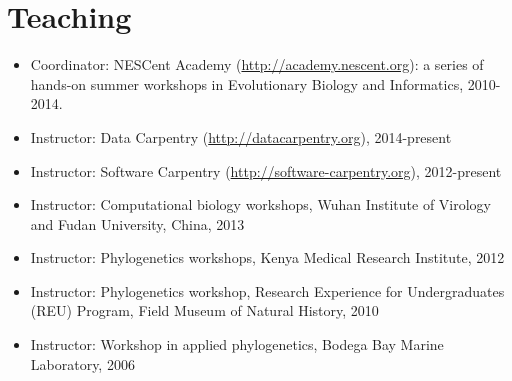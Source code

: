\documentclass[10pt]{article}
\begin{document}
\section*{Teaching}
\begin{itemize}
\item{Coordinator: NESCent Academy (\url{http://academy.nescent.org}): a series of hands-on summer workshops in Evolutionary Biology and Informatics, 2010-2014.}
\item{Instructor: Data Carpentry (\url{http://datacarpentry.org}), 2014-present}
\item{Instructor: Software Carpentry (\url{http://software-carpentry.org}), 2012-present}
\item{Instructor: Computational biology workshops, Wuhan Institute of Virology and Fudan University, China, 2013}
\item{Instructor: Phylogenetics workshops, Kenya Medical Research Institute, 2012}
\item{Instructor: Phylogenetics workshop, Research Experience for Undergraduates (REU) Program, Field Museum of Natural History, 2010}
\item{Instructor: Workshop in applied phylogenetics, Bodega Bay Marine Laboratory, 2006}
\end{itemize}
\end{document}
